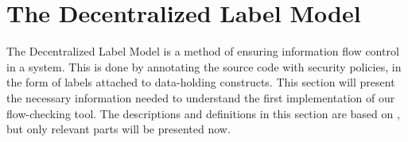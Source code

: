 \section{The Decentralized Label Model}
The Decentralized Label Model \cite{myers1997, myers1998, myers2000} is a method of ensuring information flow control in a system.
This is done by annotating the source code with security policies, in the form of labels attached to data-holding constructs.
This section will present the necessary information needed to understand the first implementation of our flow-checking tool.
The descriptions and definitions in this section are based on \cite{myers1997, myers1998, myers2000}, but only relevant parts will be presented now.
